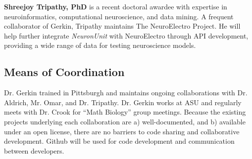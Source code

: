 \documentclass[11pt,letterpaper]{article}
\begin{document}
\textbf{Shreejoy Tripathy, PhD} is a recent doctoral awardee with expertise in neuroinformatics, computational neuroscience, and data mining.  A frequent collaborator of Gerkin, Tripathy maintains The NeuroElectro Project.  He will help further integrate \textit{NeuronUnit} with NeuroElectro through API development, providing a wide range of data for testing neuroscience models.  


\subsection{Means of Coordination}
Dr. Gerkin trained in Pittsburgh and maintains ongoing collaborations with Dr. Aldrich, Mr. Omar, and Dr. Tripathy.  Dr. Gerkin works at ASU and regularly meets with Dr. Crook for ``Math Biology'' group meetings.  Because the existing projects underlying each collaboration are a) well-documented, and b) available under an open license, there are no barriers to code sharing and collaborative development.  Github will be used for code development and communication between developers.

\end{document}
